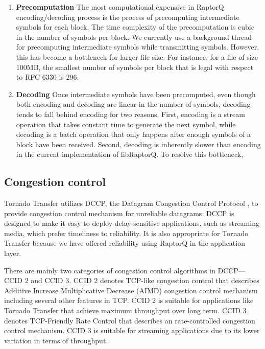 \documentclass{sig-alternate-10pt}
\begin{document}
\begin{enumerate}
  \item \textbf{Precomputation} The most computational expensive in RaptorQ encoding/decoding
process is the process of precomputing intermediate symbols for each block. The
time complexity of the precomputation is cubic in the number of symbols per
block. We currently use a background thread for precomputing intermediate
symbols while transmitting symbols. However, this has become a bottleneck for
larger file size. For instance, for a file of size 100MB, the smallest number of
symbols per block that is legal with respect to RFC 6330 is 296.

  \item \textbf{Decoding} Once intermediate symbols have been precomputed, even though both
encoding and decoding are linear in the number of symbols, decoding tends to
fall behind encoding for two reasons. First, encoding is a stream operation that
takes constant time to generate the next symbol, while decoding is a batch
operation that only happens after enough symbols of a block have been received.
Second, decoding is inherently slower than encoding in the current
implementation of libRaptorQ. To resolve this bottleneck, 
\end{enumerate}

\subsection{Congestion control}
Tornado Transfer utilizes DCCP, the Datagram Congestion Control Protocol
\cite{DCCP}, to
provide congestion control mechanism for unreliable datagrams. DCCP is designed
to make it easy to deploy delay-sensitive applications, such as streaming media,
which prefer timeliness to reliability. It is also appropriate for Tornado
Transfer because we have offered reliability using RaptorQ in the application
layer. 

There are mainly two categories of congestion control algorithms in DCCP--- CCID
2 and CCID 3. CCID 2 denotes TCP-like congestion control that describes Additive
Increase Multiplicative Decrease (AIMD) congestion control mechanism including
several other features in TCP. CCID 2 is suitable for applications like Tornado
Transfer that achieve maximum throughput over long term. CCID 3 denotes
TCP-Friendly Rate Control that describes an rate-controlled congestion control
mechanism. CCID 3 is suitable for streaming applications due to its lower
variation in terms of throughput.
\end{document}
